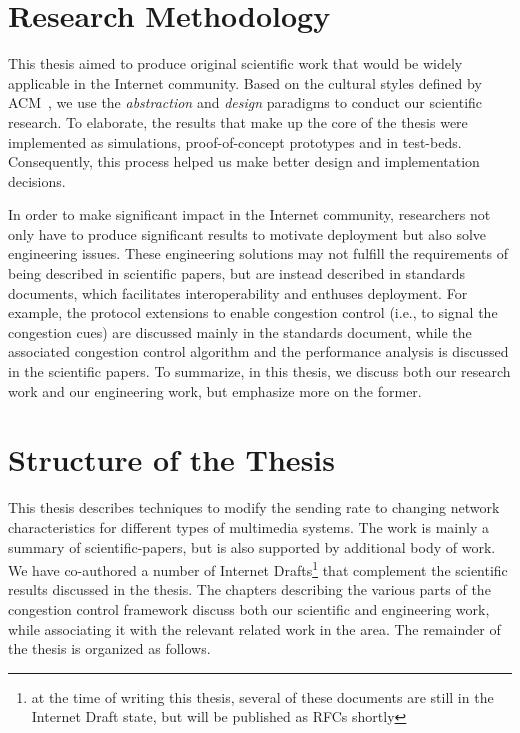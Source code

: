 \section{Research Methodology}

This thesis aimed to produce original scientific work that would be widely
applicable in the Internet community. Based on the cultural styles defined by
ACM~\cite{Denning:CS.Method}, we use the \textit{abstraction} and
\textit{design} paradigms to conduct our scientific research. To elaborate,
the results that make up the core of the thesis were implemented as
simulations, proof-of-concept prototypes and in test-beds. Consequently, this
process helped us make better design and implementation decisions.

In order to make significant impact in the Internet community, researchers not
only have to produce significant results to motivate deployment but also solve
engineering issues. These engineering solutions may not fulfill the
requirements of being described in scientific papers, but are instead
described in standards documents, which facilitates interoperability and
enthuses deployment. For example, the protocol extensions to enable congestion
control (i.e., to signal the congestion cues) are discussed mainly in the
standards document, while the associated congestion control algorithm and the
performance analysis is discussed in the scientific papers. To summarize, in
this thesis, we discuss both our research work and our engineering work, but
emphasize more on the former.



\section{Structure of the Thesis}

This thesis describes techniques to modify the sending rate to changing
network characteristics for different types of multimedia systems. The work is
mainly a summary of scientific-papers, but is also supported by additional
body of work. We have co-authored a number of Internet Drafts\footnote{at the
time of writing this thesis, several of these documents are still in the
Internet Draft state, but will be published as RFCs shortly} that complement
the scientific results discussed in the thesis. The chapters describing the
various parts of the congestion control framework discuss both our scientific
and engineering work, while associating it with the relevant related work in
the area. The remainder of the thesis is organized as follows.


